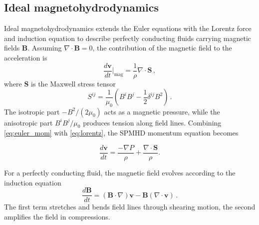 \subsection{Ideal magnetohydrodynamics}
\label{sec:mhd}

Ideal magnetohydrodynamics extends the Euler equations with the Lorentz force and induction equation to describe perfectly conducting fluids carrying magnetic fields $\mathbf{B}$.
Assuming $\nabla \cdot \mathbf{B}=0$, the contribution of the magnetic field to the acceleration is \cite{WissingShen2020}
\begin{equation}
    \frac{d\mathbf{v}}{dt}\bigg|_\mathrm{mag} = \frac{1}{\rho} \nabla \cdot \mathbf{S}\,,
    \label{eq:lorentz}
\end{equation}
where $\mathbf{S}$ is the Maxwell stress tensor
\begin{equation}
    S^{ij} = \frac{1}{\mu_0}\left(B^i B^j - \frac{1}{2}\delta^{ij} B^2\right)\,.
    \label{eq:maxwell_stress}
\end{equation}
The isotropic part $-B^2/(2\mu_0)$ acts as a magnetic pressure, while the anisotropic part $B^i B^j/\mu_0$ produces tension along field lines. Combining \ref{eq:euler_mom} with \ref{eq:lorentz}, the SPMHD momentum equation becomes

\begin{equation}
    \frac{d\mathbf{v}}{dt} = \frac{-\nabla P}{\rho} + \frac{\nabla \cdot \mathbf{S}}{\rho}.
    \label{eq:mhd_momentum}
\end{equation}


For a perfectly conducting fluid, the magnetic field evolves according to the induction equation
\begin{equation}
    \frac{d\mathbf{B}}{dt} = (\mathbf{B} \cdot \nabla)\mathbf{v} - \mathbf{B}(\nabla \cdot \mathbf{v})\,.
    \label{eq:induction}
\end{equation}
The first term stretches and bends field lines through shearing motion, the second amplifies the field in compressions.

\label{sec:divB_constraint}

